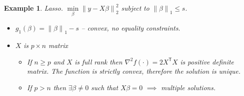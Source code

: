 \documentclass[10pt]{article}
\newtheorem{example}[ex]{Example}
\newcommand{\norm}[1]{\left\lVert #1 \right\rVert}
\newcommand{\trans}[1]{{#1}^\mathsf{T}}
\newcommand{\minl}{\min\limits}
\begin{document}
\begin{example}
  Lasso. $\minl_\beta \norm{y - X \beta}_2^2$ subject to $\norm \beta_1 \leq s$.
  \begin{itemize}
    \item $g_1(\beta) = \norm \beta_1 - s$ -- convex, no equality constraints.
    \item $X$ is $p \times n$ matrix
      \begin{itemize}
        \item If $n \geq p$ and $X$ is full rank
            then $\nabla^2 f(\cdot) = 2 \trans X X$ is positive definite matrix.
          The function is strictly convex, therefore the solution is unique.
        \item If $p > n$ then $\exists \beta \neq 0$ such that $X \beta = 0$ $\implies$ multiple solutions.
      \end{itemize}
  \end{itemize}
\end{example}
%
%
\end{document}
